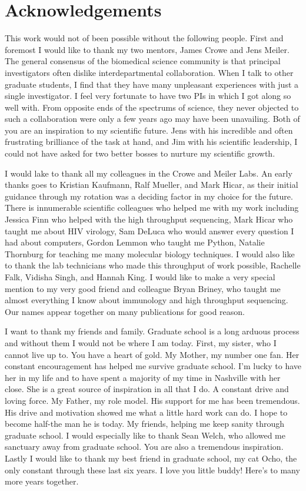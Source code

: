 \chapter*{Acknowledgements}
\vspace{7mm}
This work would not of been possible without the following people.
First and foremost I would like to thank my two mentors, James Crowe and Jens Meiler. The general consensus of the biomedical science community is that principal investigators often dislike interdepartmental collaboration. When I talk to other graduate students, I find that they have many unpleasant experiences with just a single investigator. I feel very fortunate to have two PIs in which I got along so well with. From opposite ends of the spectrums of science, they never objected to such a collaboration were only a few years ago may have been unavailing. Both of you are an inspiration to my scientific future. Jens with his incredible and often frustrating brilliance of the task at hand, and Jim with his scientific leadership, I could not have asked for two better bosses to nurture my scientific growth.

I would lake to thank all my colleagues in the Crowe and Meiler Labs. An early thanks goes to Kristian Kaufmann, Ralf Mueller, and Mark Hicar, as their initial guidance through my rotation was a deciding factor in my choice for the future. There is innumerable scientific colleagues who helped me with my work including Jessica Finn who helped with the high throughput sequencing, Mark Hicar who taught me about HIV virology, Sam DeLuca who would answer every question I had about computers, Gordon Lemmon who taught me Python, Natalie Thornburg for teaching me many molecular biology techniques. I would also like to thank the lab technicians who made this throughput of work possible, Rachelle Falk, Vidisha Singh, and Hannah King. I would like to make a very special mention to my very good friend and colleague Bryan Briney, who taught me almost everything I know about immunology and high throughput sequencing. Our names appear together on many publications for good reason.

I want to thank my friends and family. Graduate school is a long arduous process and without them I would not be where I am today. First, my sister, who I cannot live up to. You have a heart of gold. My Mother, my number one fan. Her constant encouragement has helped me survive graduate school. I'm lucky to have her in my life and to have spent a majority of my time in Nashville with her close. She is a great source of inspiration in all that I do. A constant drive and loving force. My Father, my role model. His support for me has been tremendous. His drive and motivation showed me what a little hard work can do. I hope to become half-the man he is today. My friends, helping me keep sanity through graduate school. I would especially like to thank Sean Welch, who allowed me sanctuary away from graduate school. You are also a tremendous inspiration. Lastly I would like to thank my best friend in graduate school, my cat Ocho, the only constant through these last six years. I love you little buddy! Here's to many more years together.
